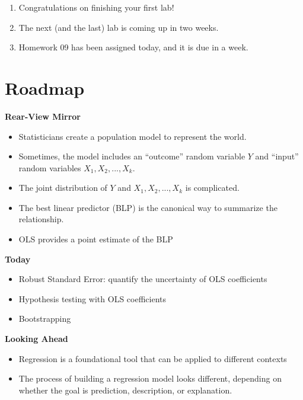 \documentclass[
]{book}
\providecommand{\tightlist}{%
  \setlength{\itemsep}{0pt}\setlength{\parskip}{0pt}}
\theoremstyle{definition}
\theoremstyle{definition}
\theoremstyle{definition}
\theoremstyle{definition}
\theoremstyle{remark}
\begin{document}
\begin{enumerate}
\def\labelenumi{\arabic{enumi}.}
\tightlist
\item
  Congratulations on finishing your first lab!
\item
  The next (and the last) lab is coming up in two weeks.
\item
  Homework 09 has been assigned today, and it is due in a week.
\end{enumerate}

\hypertarget{roadmap-5}{%
\section{Roadmap}\label{roadmap-5}}

\textbf{Rear-View Mirror}

\begin{itemize}
\tightlist
\item
  Statisticians create a population model to represent the world.
\item
  Sometimes, the model includes an ``outcome'' random variable \(Y\) and ``input'' random variables \(X_1, X_2,...,X_k\).
\item
  The joint distribution of \(Y\) and \(X_1, X_2,...,X_k\) is complicated.
\item
  The best linear predictor (BLP) is the canonical way to summarize the relationship.
\item
  OLS provides a point estimate of the BLP
\end{itemize}

\textbf{Today}

\begin{itemize}
\tightlist
\item
  Robust Standard Error: quantify the uncertainty of OLS coefficients
\item
  Hypothesis testing with OLS coefficients
\item
  Bootstrapping
\end{itemize}

\textbf{Looking Ahead}

\begin{itemize}
\tightlist
\item
  Regression is a foundational tool that can be applied to different contexts
\item
  The process of building a regression model looks different, depending on whether the goal is prediction, description, or explanation.
\end{itemize}
\end{document}
